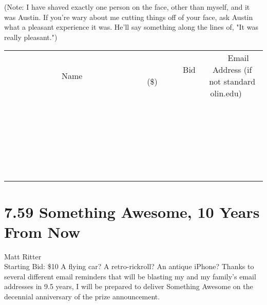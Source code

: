 \documentclass[11pt]{article}
\begin{document}
(Note: I have shaved exactly one person on the face, other than myself, and it was Austin. If you're wary about me cutting things off of your face, ask Austin what a pleasant experience it was. He'll say something along the lines of, "It was really pleasant.")
\\[6ex]
\begin{tabular}{c c c}
~~~~~~~~~~~~~Name~~~~~~~~~~~~~ & ~~~~~~~~~Bid (\$)~~~~~~~~~  & ~~~Email Address (if not standard olin.edu)~~~\\
 & & \\
\hline
 & & \\
\hline
 & & \\
\hline
 & & \\
\hline
 & & \\
\hline
 & & \\
\hline
 & & \\
\hline
 & & \\
\hline
 & & \\
\hline
 & & \\
\hline
 & & \\
\hline
 & & \\
\hline
 & & \\
\hline
 & & \\
\hline
 & & \\
\hline
 & & \\
\hline
 & & \\
\hline
 & & \\
\hline
 & & \\
\hline
 & & \\
\hline
 & & \\
\hline
 & & \\
\hline
 & & \\
\hline
 & & \\
\hline
 & & \\
\hline
 & & \\
\hline
\end{tabular}
\newpage
\section*{7.59 Something Awesome, 10 Years From Now}
Matt Ritter
\\
Starting Bid: \$10
\newline
A flying car? A retro-rickroll? An antique iPhone?
Thanks to several different email reminders that will be blasting my and my family’s email addresses in 9.5 years, I will be prepared to deliver Something Awesome on the decennial anniversary of the prize announcement.
\end{document}
